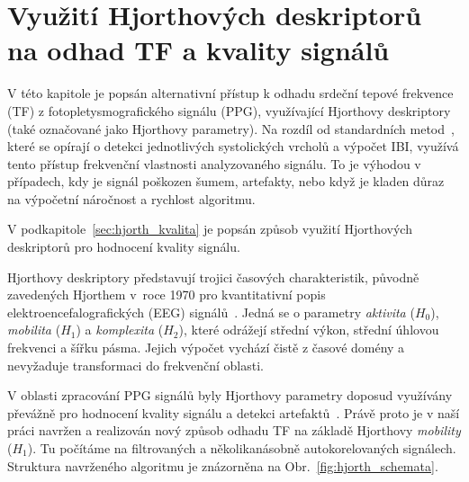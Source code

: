 
\chapter{Využití Hjorthových deskriptorů na odhad TF a kvality signálů}
\label{ch:hjorth}
V této kapitole je popsán alternativní přístup k odhadu srdeční tepové frekvence (\acs{TF}) z fotopletysmografického signálu (\acs{PPG}), využívající Hjorthovy deskriptory (také označované jako Hjorthovy parametry).
Na rozdíl od standardních metod~\cite{ENIKÖ,Charlton2022,NeuroKit2}, které se opírají o detekci jednotlivých systolických vrcholů a výpočet \acs{IBI}, využívá tento přístup frekvenční vlastnosti analyzovaného signálu.
To je výhodou v případech, kdy je signál poškozen šumem, artefakty, nebo když je kladen důraz na výpočetní náročnost a rychlost algoritmu.

V podkapitole~\ref{sec:hjorth_kvalita} je popsán způsob využití Hjorthových deskriptorů pro hodnocení kvality signálu. %

Hjorthovy deskriptory představují trojici časových charakteristik, původně zavedených Hjorthem v~roce 1970 pro kvantitativní popis elektroencefalografických (\acs{EEG}) signálů~\cite{Hjorth1973}.
Jedná se o parametry \textit{aktivita} (\(H_0\)), \textit{mobilita} (\(H_1\)) a \textit{komplexita} (\(H_2\)), které odrážejí střední výkon, střední úhlovou frekvenci a šířku pásma.
Jejich výpočet vychází čistě z časové domény a nevyžaduje transformaci do frekvenční oblasti.

V oblasti zpracování \acs{PPG} signálů byly Hjorthovy parametry doposud využívány převážně pro hodnocení kvality signálu a detekci artefaktů~\cite{Peralta2017}. %
Právě proto je v naší práci navržen a realizován nový způsob odhadu \acs{TF} na základě Hjorthovy \textit{mobility} (\(H_1\)).
Tu počítáme na filtrovaných a několikanásobně autokorelovaných signálech.
Struktura navrženého algoritmu je znázorněna na Obr.~\ref{fig:hjorth_schemata}.

